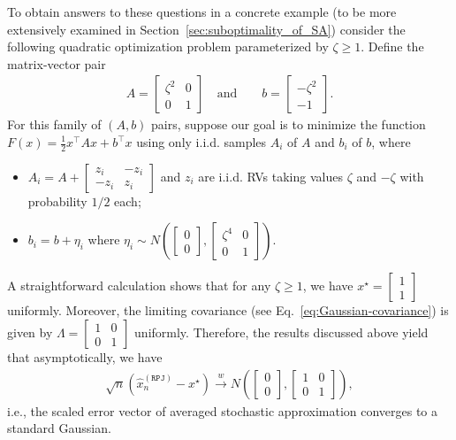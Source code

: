 \documentclass[11pt,twoside]{article}
\numberwithin{equation}{section}
\newcommand{\1}{\mathbf{1}}
\theoremstyle{remark}
\theoremstyle{plain}
\newcommand{\rpj}{\widehat x_n^{(\texttt{RPJ})}}
\begin{document}
    To obtain answers to these questions in a concrete example (to be more extensively examined in Section~\ref{sec:suboptimality_of_SA}) consider the following quadratic optimization problem parameterized by $\zeta \ge 1$.
	Define the matrix-vector pair
	\begin{align} \label{eqn:example_break_robust_SA}
	A = \begin{bmatrix}
	\zeta^2 & 0 \\
	0 & 1
	\end{bmatrix} \quad \text{and}  \qquad b = \begin{bmatrix}
	-\zeta^2 \\
	-1
	\end{bmatrix}.
	\end{align}
	For this family of $(A, b)$ pairs, suppose our goal is to minimize the function $F(x) = \frac{1}{2} x^\top A x + b^\top x$  using only i.i.d. samples $A_i$ of $A$ and $b_i$ of $b$, where 
	\begin{itemize}
		\item $A_i = A + \begin{bmatrix}
		z_i &  -z_i \\
		-z_i & z_i
		\end{bmatrix}$ and $z_i$ are i.i.d. RVs taking values $\zeta$ and $-\zeta$ with probability $1/2$ each;
		\item $b_i = b + \eta_i$ where $\eta_i \sim N\left(\begin{bmatrix}
		0\\
		0
		\end{bmatrix}, \begin{bmatrix}
		\zeta^4 & 0\\
		0 & 1
		\end{bmatrix}\right)$.
	\end{itemize}
A straightforward calculation shows that for any $\zeta \ge 1$, we have $ x^\star = \begin{bmatrix}
	1\\
	1
	\end{bmatrix}$ uniformly. Moreover, the limiting covariance (see Eq.~\eqref{eq:Gaussian-covariance}) is given by $\Lambda = \begin{bmatrix}
	1 & 0\\
	0&  1
	\end{bmatrix}$ uniformly. 
Therefore, the results discussed above yield that asymptotically, we have 
\begin{align*}
\sqrt{n}(\rpj - x^\star) \overset{w}{\longrightarrow} N\left(\begin{bmatrix}
0\\
0
\end{bmatrix}, \begin{bmatrix}
1 & 0 \\
0 & 1
\end{bmatrix}\right),
\end{align*}
i.e., the scaled error vector of averaged stochastic approximation converges to a standard Gaussian.
\end{document}
